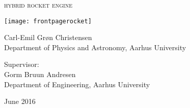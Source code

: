 
\begin{titlingpage}

\begin{center}

\vspace*{0cm}
\huge
\textsc{hybrid rocket engine}\\
\vspace{1.5cm}

\texttt{[image: frontpagerocket]}
\vspace{1.2cm}

\large
{
    Carl-Emil Grøn Christensen\\
    Department of Physics and Astronomy, Aarhus University
}

\vspace{1.5cm}

{
  Supervisor:\\
  Gorm Bruun Andresen\\
  Department of Engineering, Aarhus University
}

\vspace{1.5cm}
{June 2016}\\


\end{center}



\end{titlingpage}
